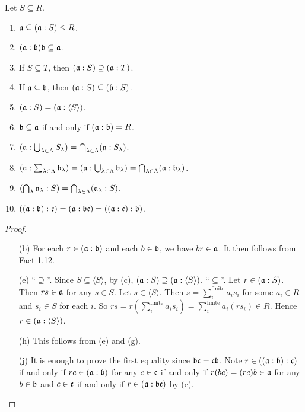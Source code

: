 \begin{fact}
    Let $S \subseteq R$.
    \begin{enumerate}
        \item $\mathfrak{a} \subseteq (\mathfrak{a}:S) \leq R$.
        \item $(\mathfrak{a}:\mathfrak{b})\mathfrak{b} \subseteq \mathfrak{a}$. 
        \item If $S \subseteq T$, then $(\mathfrak{a}:S) \supseteq (\mathfrak{a}:T)$.
        \item If $\mathfrak{a} \subseteq \mathfrak{b}$, then $(\mathfrak{a}:S) \subseteq (\mathfrak{b}:S)$.
        \item $(\mathfrak{a}:S) = (\mathfrak{a}:\langle S \rangle)$.
        \item $\mathfrak{b} \subseteq \mathfrak{a}$ if and only if $(\mathfrak{a}:\mathfrak{b}) = R$.
        \item $(\mathfrak{a}: \bigcup_{\lambda \in \Lambda}S_\lambda) = \bigcap_{\lambda \in \Lambda} (\mathfrak{a}:S_\lambda)$.
        \item $(\mathfrak{a}: \sum_{\lambda \in \Lambda}\mathfrak{b}_\lambda) = (\mathfrak{a}: \bigcup_{\lambda \in \Lambda} \mathfrak{b}_\lambda) = \bigcap_{\lambda \in \Lambda}(\mathfrak{a}: \mathfrak{b}_\lambda)$.
        \item $(\bigcap_{\lambda}\mathfrak{a}_\lambda:S) = \bigcap_{\lambda \in \Lambda}(\mathfrak{a}_\lambda:S)$.
        \item $((\mathfrak{a}:\mathfrak{b}):\mathfrak{c}) = (\mathfrak{a}:\mathfrak{b}\mathfrak{c}) = ((\mathfrak{a}:\mathfrak{c}):\mathfrak{b})$.
    \end{enumerate}
\end{fact}

\begin{proof}
    \begin{enumerate}
        \item[(b)]
            For each $r \in (\mathfrak{a}:\mathfrak{b})$ and each $b \in \mathfrak{b}$, we have $br \in \mathfrak{a}$. It then follows from Fact 1.12.
        \item[(e)]
            ``$\supseteq$''. Since $S \subseteq \langle S \rangle$, by (c), $(\mathfrak{a}:S) \supseteq (\mathfrak{a}:\langle S \rangle)$. ``$\subseteq$''. Let $r \in (\mathfrak{a}:S)$. Then $rs \in \mathfrak{a}$ for any $s \in S$. Let $s \in \langle S \rangle$. Then $s = \sum_{i}^{\text{finite}}a_is_i$ for some $a_i \in R$ and $s_i \in S$ for each $i$. So $rs = r(\sum_i^{\text{finite}}a_is_i) = \sum_i^{\text{finite}} a_i(rs_i) \in R$. Hence $r \in (\mathfrak{a}:\langle S \rangle)$.
        \item[(h)] This follows from (e) and (g).
        \item [(j)]
            It is enough to prove the first equality since $\mathfrak{b}\mathfrak{c} = \mathfrak{c}\mathfrak{b}$. Note $r \in ((\mathfrak{a}:\mathfrak{b}):\mathfrak{c})$ if and only if $rc \in (\mathfrak{a}:\mathfrak{b})$ for any $c \in \mathfrak{c}$ if and only if $r(bc) = (rc)b \in \mathfrak{a}$ for any $b \in \mathfrak{b}$ and $c \in \mathfrak{c}$ if and only if $r \in (\mathfrak{a}:\mathfrak{b}\mathfrak{c})$ by (e). \qedhere
    \end{enumerate}
\end{proof}

